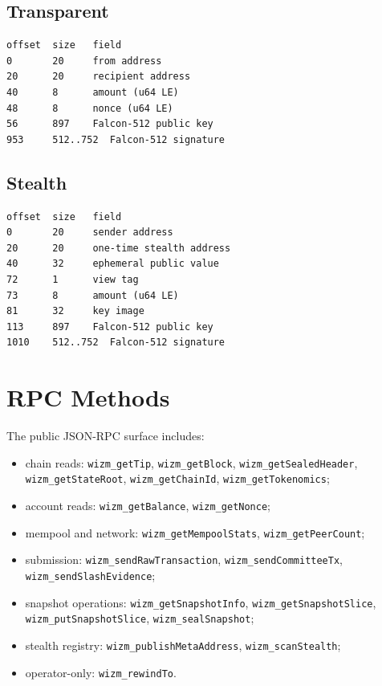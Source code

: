 \documentclass[11pt,a4paper]{article}
\begin{document}
\subsection{Transparent}
\begin{verbatim}
offset  size   field
0       20     from address
20      20     recipient address
40      8      amount (u64 LE)
48      8      nonce (u64 LE)
56      897    Falcon-512 public key
953     512..752  Falcon-512 signature
\end{verbatim}

\subsection{Stealth}
\begin{verbatim}
offset  size   field
0       20     sender address
20      20     one-time stealth address
40      32     ephemeral public value
72      1      view tag
73      8      amount (u64 LE)
81      32     key image
113     897    Falcon-512 public key
1010    512..752  Falcon-512 signature
\end{verbatim}

\section{RPC Methods}
\label{app:rpc}

The public JSON-RPC surface includes:
\begin{itemize}[leftmargin=*]
  \item chain reads: \texttt{wizm\_getTip}, \texttt{wizm\_getBlock},
        \texttt{wizm\_getSealedHeader}, \texttt{wizm\_getStateRoot},
        \texttt{wizm\_getChainId}, \texttt{wizm\_getTokenomics};
  \item account reads: \texttt{wizm\_getBalance}, \texttt{wizm\_getNonce};
  \item mempool and network: \texttt{wizm\_getMempoolStats},
        \texttt{wizm\_getPeerCount};
  \item submission: \texttt{wizm\_sendRawTransaction},
        \texttt{wizm\_sendCommitteeTx}, \texttt{wizm\_sendSlashEvidence};
  \item snapshot operations: \texttt{wizm\_getSnapshotInfo},
        \texttt{wizm\_getSnapshotSlice}, \texttt{wizm\_putSnapshotSlice},
        \texttt{wizm\_sealSnapshot};
  \item stealth registry: \texttt{wizm\_publishMetaAddress},
        \texttt{wizm\_scanStealth};
  \item operator-only: \texttt{wizm\_rewindTo}.
\end{itemize}
\end{document}
